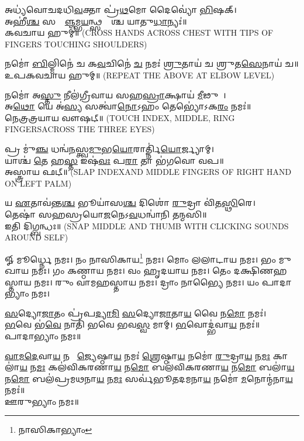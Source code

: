 𑌅𑌧𑍍𑌯॑𑌵𑍋𑌚𑌦𑌧𑌿\ul{𑌵}𑌕𑍍𑌤𑌾 𑌪𑍍𑌰॑\ul{𑌥}𑌮𑍋 𑌦𑍈𑌵𑍍𑌯𑍋॑ \ul{𑌭𑌿}𑌷𑌕𑍍।\\
𑌅𑌹𑍀॑\ul{𑌶𑍍𑌚} 𑌸𑌰𑍍𑌵𑌾᳚\ul{𑌞𑍍𑌜}𑌮𑍍𑌭\ul{𑌯}𑌨𑍍𑌥𑍍𑌸𑌰𑍍𑌵𑌾᳚𑌶𑍍𑌚 𑌯𑌾𑌤𑍁\ul{𑌧𑌾}𑌨𑍍𑌯𑌃॑॥\\
𑌕𑌵𑌚𑌾𑌯 𑌹𑍁𑌮𑍍॥ {\scriptsize (CROSS HANDS ACROSS CHEST WITH TIPS OF FINGERS TOUCHING SHOULDERS)}


𑌨𑌮𑍋॑ \ul{𑌬𑌿}𑌲𑍍𑌮𑌿𑌨𑍇॑ 𑌚 𑌕\ul{𑌵}𑌚𑌿𑌨𑍇॑ \ul{𑌚} 𑌨𑌮𑌃॑ \ul{𑌶𑍍𑌰𑍁}𑌤𑌾𑌯॑ 𑌚 𑌶𑍍𑌰𑍁𑌤\ul{𑌸𑍇}𑌨𑌾𑌯॑ 𑌚॥\\
𑌉𑌪𑌕𑌵𑌚𑌾𑌯 𑌹𑍁𑌮𑍍॥ {\scriptsize (REPEAT THE ABOVE AT ELBOW LEVEL)}

𑌨𑌮𑍋॑ 𑌅\ul{𑌸𑍍𑌤𑍁} 𑌨𑍀𑌲॑𑌗𑍍𑌰𑍀𑌵𑌾𑌯 𑌸𑌹\ul{𑌸𑍍𑌰𑌾}𑌕𑍍𑌷𑌾𑌯॑ \ul{𑌮𑍀}𑌢𑍁𑌷𑍇᳚। \\
𑌅\ul{𑌥𑍋} 𑌯𑍇 𑌅॑\ul{𑌸𑍍𑌯} 𑌸𑌤𑍍𑌵𑌾॑\ul{𑌨𑍋}𑌽𑌹𑌂 𑌤𑍇𑌭𑍍𑌯𑍋॑𑌽𑌕\ul{𑌰𑌂} 𑌨𑌮𑌃॑॥ \\
𑌨𑍇𑌤𑍍𑌰𑌤𑍍𑌰𑌯𑌾𑌯 𑌵𑍗𑌷𑌟𑍍॥ {\scriptsize (TOUCH INDEX, MIDDLE, RING FINGERSACROSS THE THREE EYES)}


𑌪𑍍𑌰 𑌮𑍁॑\ul{𑌞𑍍𑌚} 𑌧𑌨𑍍𑌵॑\ul{𑌨}𑌸𑍍𑌤𑍍𑌵\ul{𑌮𑍁}𑌭\ul{𑌯𑍋}𑌰𑌾𑌰𑍍𑌤𑍍𑌨𑌿॑\ul{𑌯𑍋}𑌰𑍍𑌜𑍍𑌯𑌾𑌮𑍍।\\
𑌯𑌾𑌶𑍍𑌚॑ \ul{𑌤𑍇} 𑌹\ul{𑌸𑍍𑌤} 𑌇𑌷॑\ul{𑌵𑌃} 𑌪\ul{𑌰𑌾} 𑌤𑌾 𑌭॑𑌗𑌵𑍋 𑌵𑌪॥\\ 
𑌅𑌸𑍍𑌤𑍍𑌰𑌾𑌯 𑌫𑌟𑍍॥ {\scriptsize (SLAP INDEXAND MIDDLE FINGERS OF RIGHT HAND ON LEFT PALM)}

𑌯 \ul{𑌏}𑌤𑌾𑌵॑𑌨𑍍𑌤\ul{𑌶𑍍𑌚} 𑌭𑍂𑌯𑌾॑𑌸\ul{𑌶𑍍𑌚} 𑌦𑌿𑌶𑍋॑ \ul{𑌰𑍁}𑌦𑍍𑌰𑌾 𑌵𑌿॑𑌤\ul{𑌸𑍍𑌥𑌿}𑌰𑍇।\\
 𑌤𑍇𑌷𑌾॑ 𑌸𑌹𑌸𑍍𑌰𑌯𑍋\ul{𑌜}𑌨𑍇𑌽\ul{𑌵}𑌧𑌨𑍍𑌵𑌾॑𑌨𑌿 𑌤𑌨𑍍𑌮𑌸𑌿॥ \\
𑌇𑌤𑌿 𑌦𑌿𑌗𑍍𑌬𑌨𑍍𑌧𑌃॥ {\scriptsize (SNAP MIDDLE AND THUMB WITH CLICKING SOUNDS AROUND SELF)}

{\small \closesection}

𑍐 𑌮𑍂𑌰𑍍𑌧𑍍𑌨𑍇 𑌨𑌮𑌃। 𑌨𑌂 𑌨𑌾𑌸𑌿𑌕𑌾𑌯\footnote{𑌨𑌾𑌸𑌿𑌕𑌾𑌭𑍍𑌯𑌾𑌂} 𑌨𑌮𑌃। 𑌮𑍋𑌂 𑌲𑌲𑌾𑌟𑌾𑌯 𑌨𑌮𑌃। 𑌭𑌂 𑌮𑍁𑌖𑌾𑌯 𑌨𑌮𑌃। 𑌗𑌂 𑌕𑌣𑍍𑌠𑌾𑌯 𑌨𑌮𑌃। 𑌵𑌂 𑌹𑍃𑌦𑌯𑌾𑌯 𑌨𑌮𑌃। 𑌤𑍇𑌂 𑌦𑌕𑍍𑌷𑌿𑌣𑌹𑌸𑍍𑌤𑌾𑌯 𑌨𑌮𑌃। 𑌰𑍁𑌂 𑌵𑌾𑌮𑌹𑌸𑍍𑌤𑌾𑌯 𑌨𑌮𑌃। 𑌦𑍍𑌰𑌾𑌂 𑌨𑌾𑌭𑍍𑌯𑍈 𑌨𑌮𑌃। 𑌯𑌂 𑌪𑌾𑌦𑌾𑌭𑍍𑌯𑌾𑌂 𑌨𑌮𑌃।

\ul{𑌸}𑌦𑍍𑌯𑍋\ul{𑌜𑌾}𑌤𑌂 𑌪𑍍𑌰॑𑌪\ul{𑌦𑍍𑌯𑌾}\ul{𑌮𑌿} \ul{𑌸}𑌦𑍍𑌯𑍋\ul{𑌜𑌾}𑌤𑌾\ul{𑌯} 𑌵𑍈 𑌨\ul{𑌮𑍋} 𑌨𑌮𑌃॑।\\
\ul{𑌭}𑌵𑍇 𑌭॑\ul{𑌵𑍇} 𑌨𑌾𑌤𑌿॑ 𑌭𑌵𑍇 𑌭𑌵\ul{𑌸𑍍𑌵} 𑌮𑌾𑌮𑍍। \ul{𑌭}𑌵𑍋𑌦𑍍𑌭॑𑌵𑌾\ul{𑌯} 𑌨𑌮𑌃॑॥ \\
𑌪𑌾𑌦𑌾𑌭𑍍𑌯𑌾𑌂 𑌨𑌮𑌃॥

\ul{𑌵𑌾}\ul{𑌮}\ul{𑌦𑍇}𑌵𑌾\ul{𑌯} 𑌨𑌮𑍋᳚ \ul{𑌜𑍍𑌯𑍇}𑌷𑍍𑌠𑌾\ul{𑌯} 𑌨𑌮𑌃॑ \ul{𑌶𑍍𑌰𑍇}𑌷𑍍𑌠𑌾\ul{𑌯} 𑌨𑌮𑍋॑ \ul{𑌰𑍁}𑌦𑍍𑌰𑌾\ul{𑌯} 𑌨\ul{𑌮𑌃} 𑌕𑌾𑌲𑌾॑\ul{𑌯} 𑌨\ul{𑌮𑌃} 𑌕𑌲॑𑌵𑌿𑌕𑌰𑌣𑌾\ul{𑌯} 𑌨\ul{𑌮𑍋} 𑌬𑌲॑𑌵𑌿𑌕𑌰𑌣𑌾\ul{𑌯} 𑌨\ul{𑌮𑍋} 𑌬𑌲𑌾॑\ul{𑌯} 𑌨\ul{𑌮𑍋} 𑌬𑌲॑𑌪𑍍𑌰𑌮𑌥𑌨𑌾\ul{𑌯} 𑌨\ul{𑌮𑌃} 𑌸𑌰𑍍𑌵॑𑌭𑍂𑌤𑌦𑌮𑌨𑌾\ul{𑌯} 𑌨𑌮𑍋॑ \ul{𑌮}𑌨𑍋𑌨𑍍𑌮॑𑌨𑌾\ul{𑌯} 𑌨𑌮𑌃॑॥\\
𑌊𑌰𑍁𑌭𑍍𑌯𑌾𑌂 𑌨𑌮𑌃॥ 

